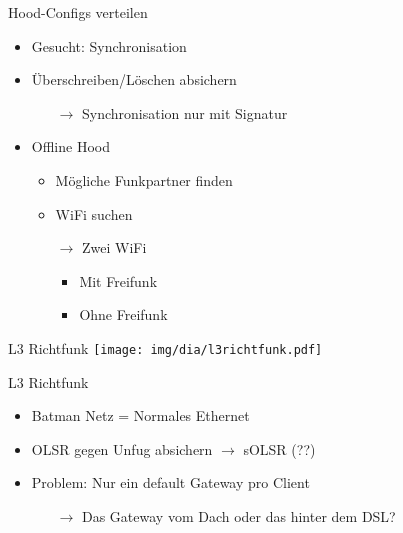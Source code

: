 \begin{frame}{Hood-Configs verteilen}
    \begin{itemize}
        \item Gesucht: Synchronisation
        \item Überschreiben/Löschen absichern
        \begin{itemize}
            \item[$\rightarrow$] Synchronisation nur mit Signatur
        \end{itemize}
        \item Offline Hood
        \begin{itemize}
            \item Mögliche Funkpartner finden
            \item WiFi suchen
            \item[$\rightarrow$] Zwei WiFi
            \begin{itemize}
                \item Mit Freifunk
                \item Ohne Freifunk
            \end{itemize}
        \end{itemize}
    \end{itemize}
\end{frame}

\begin{frame}{L3 Richtfunk}
    \center
    \texttt{[image: img/dia/l3richtfunk.pdf]}
\end{frame}

\begin{frame}{L3 Richtfunk}
    \begin{itemize}
        \item Batman Netz = Normales Ethernet
        \item OLSR gegen Unfug absichern $\rightarrow$ sOLSR (??)
        \item Problem: Nur ein default Gateway pro Client
        \begin{itemize}
            \item[$\rightarrow$] Das Gateway vom Dach oder das hinter dem DSL?
        \end{itemize}
    \end{itemize}
\end{frame}
